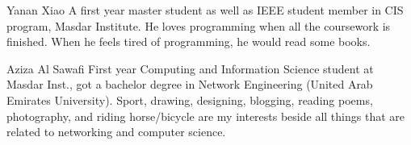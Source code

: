 \documentclass[journal]{IEEEtran}
\begin{document}


%


\begin{IEEEbiographynophoto}{Yanan Xiao}
A first year master student as well as IEEE student member in CIS program, Masdar Institute. He loves programming when all the coursework is finished. When he feels tired of programming, he would read some books.
\end{IEEEbiographynophoto}


\begin{IEEEbiographynophoto}{Aziza Al Sawafi}
 First year Computing and Information Science student at Masdar Inst., got a bachelor degree in Network Engineering (United Arab Emirates University). Sport, drawing, designing, blogging, reading poems, photography, and riding horse/bicycle are my interests beside all things that are related to networking and computer science.
\end{IEEEbiographynophoto}


\vfill

\enlargethispage{-5in}



\end{document}
